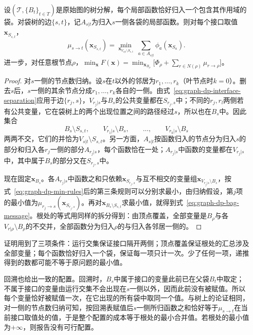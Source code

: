 \begin{theorem}[袋消息的含义]
\label{thm:graph-dp-bag-message}
设$(\mathcal T,\{B_t\}_{t\in T})$是原始图的树分解，每个局部函数恰好归入一个包含其作用域的袋。对袋树的边$\{s,t\}$，记$A_{s|t}$为归入$s$一侧各袋的局部函数。则对每个接口取值$\bm x_{S_{s,t}}$，
\[
\mu_{s\to t}(\bm x_{S_{s,t}})=\min_{\bm x_{V_{s|t}\setminus S_{s,t}}}\ \sum_{a\in A_{s|t}}\phi_a(\bm x_{S_a}).
\]
进一步，对任意根节点$\rho$，$\min_{\bm x}F(\bm x)=\min_{\bm x_{B_\rho}}\bigl[\Phi_\rho+\sum_{r\in N(\rho)}\mu_{r\to\rho}\bigr]$。
\end{theorem}

\begin{proof}
对$s$一侧的节点数归纳。设$s$在$t$以外的邻居为$r_1,\ldots,r_k$（叶节点时$k=0$）。删去$s$后，$s$一侧的其余节点分成$r_1,\ldots,r_k$各自的一侧。由式~\eqref{eq:graph-dp-interface-separation}应用于边$\{r_j,s\}$，$V_{r_j|s}$与$B_s$的公共变量都在$S_{r_j,s}$中；不同的$r_j,r_l$两侧若有公共变量，它在袋树上的两个出现位置之间的路径经过$s$，所以也在$B_s$中。因此集合
\[
B_s\setminus S_{s,t},\qquad V_{r_1|s}\setminus B_s,\qquad\ldots,\qquad V_{r_k|s}\setminus B_s
\]
两两不交，它们的并恰为$V_{s|t}\setminus S_{s,t}$。另一方面，$A_{s|t}$按函数归入的节点分为归入$s$的部分和归入各$r_j$一侧的部分$A_{r_j|s}$，每个函数恰在一处；$A_{r_j|s}$中函数的变量都在$V_{r_j|s}$中，其中属于$B_s$的部分又在$S_{r_j,s}$中。

现在固定$\bm x_{B_s}$。各$A_{r_j|s}$中函数之和只依赖$\bm x_{S_{r_j,s}}$与互不相交的变量组$\bm x_{V_{r_j|s}\setminus B_s}$，按式~\eqref{eq:graph-dp-min-rules}后的第三条规则可以分别求最小，由归纳假设，第$j$项的最小值为$\mu_{r_j\to s}(\bm x_{S_{r_j,s}})$。再对$\bm x_{B_s\setminus S_{s,t}}$求最小值，就得到式~\eqref{eq:graph-dp-bag-message}。根处的等式用同样的拆分得到：由顶点覆盖，全部变量是$B_\rho$与各$V_{r|\rho}\setminus B_\rho$的不交并，全部函数分为归入$\rho$的与归入各邻居一侧的。
\end{proof}

证明用到了三项条件：运行交集保证接口隔开两侧；顶点覆盖保证根处的汇总涉及全部变量；每个函数恰好归入一个袋，保证每一项只计一次。少了任何一项，递推得到的数都可能不等于原问题的最小值。

回溯也给出一致的配置。回溯时，$B_s$中属于接口的变量此前已在父袋$B_t$中取定；不属于接口的变量由运行交集不会出现在$s$一侧以外，因而此前没有被赋值。所以每个变量恰好被赋值一次，在它出现的所有袋中取同一个值。与树上的论证相同，对一侧的节点数归纳可知，按回溯表赋值后$s$一侧所归函数之和恰好等于$\mu_{s\to t}$在当前接口取值处的值，于是整个配置的成本等于根处的最小合并值。若根处的最小值为$+\infty$，则报告没有可行配置。

